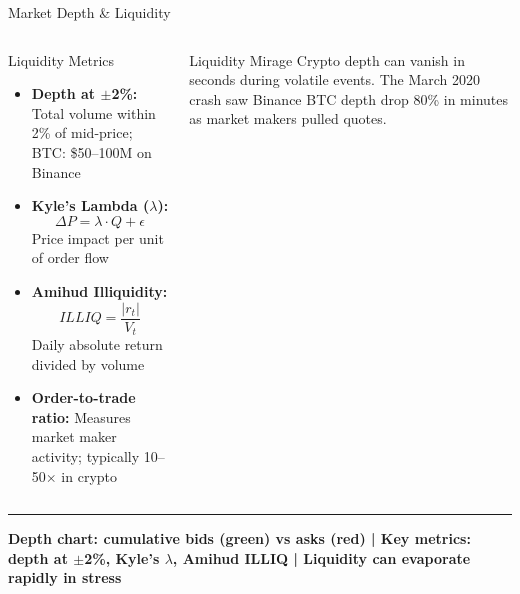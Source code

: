 \documentclass[8pt,aspectratio=169]{beamer}
\newcommand{\bottomnote}[1]{\vfill\vspace{-2mm}\textcolor{mllavender2}{\rule{\textwidth}{0.4pt}}\vspace{1mm}\footnotesize\textbf{#1}}
\begin{document}
\begin{frame}{Market Depth \& Liquidity}
\begin{columns}[T]
\begin{block}{Liquidity Metrics}
\begin{itemize}\setlength{\itemsep}{2pt}
  \item \textbf{Depth at $\pm$2\%:} Total volume within 2\% of mid-price; BTC: \$50--100M on Binance
  \item \textbf{Kyle's Lambda ($\lambda$):}
  \[\Delta P = \lambda \cdot Q + \epsilon\]
  Price impact per unit of order flow
  \item \textbf{Amihud Illiquidity:}
  \[ILLIQ = \frac{|r_t|}{V_t}\]
  Daily absolute return divided by volume
  \item \textbf{Order-to-trade ratio:} Measures market maker activity; typically 10--50$\times$ in crypto
\end{itemize}
\end{block}
\vspace{1mm}
\begin{alertblock}{Liquidity Mirage}
\scriptsize Crypto depth can vanish in seconds during volatile events. The March 2020 crash saw Binance BTC depth drop 80\% in minutes as market makers pulled quotes.
\end{alertblock}
\end{columns}
\bottomnote{Depth chart: cumulative bids (green) vs asks (red) | Key metrics: depth at $\pm$2\%, Kyle's $\lambda$, Amihud ILLIQ | Liquidity can evaporate rapidly in stress}
\end{frame}
\end{document}
